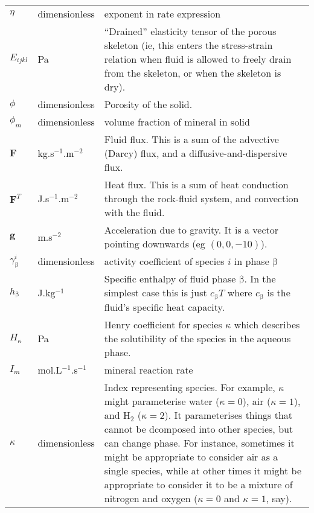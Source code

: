 \documentclass[12pt]{report}
\def\species{\kappa}
\def\phase{\mathrm{\beta}}
\def\flux{\mathbf{F}}
\begin{document}
\begin{longtable}{llp{10cm}}
$\eta$ & dimensionless & exponent in rate expression \\

$E_{ijkl}$ & Pa & ``Drained'' elasticity tensor of the porous skeleton
(ie, this enters the stress-strain relation when fluid is allowed to
freely drain from the skeleton, or when the skeleton is dry). \\

$\phi$ & dimensionless & Porosity of the solid. \\

$\phi_{m}$ & dimensionless & volume fraction of mineral in solid \\

$\flux$ & kg.s$^{-1}$.m$^{-2}$ & Fluid flux.  This is a sum of
the advective (Darcy) flux, and a diffusive-and-dispersive flux. \\

$\flux^{T}$ & J.s$^{-1}$.m$^{-2}$ & Heat flux.  This is a sum of heat
conduction through the rock-fluid system, and convection with the
fluid. \\

${\mathbf g}$ & m.s$^{-2}$ & Acceleration due to gravity.  It is a
vector pointing downwards (eg $(0, 0, -10)$). \\

$\gamma_{\phase}^{i}$ & dimensionless & activity coefficient of
species $i$ in phase $\phase$ \\

$h_{\phase}$ & J.kg$^{-1}$ & Specific enthalpy of fluid phase
$\phase$. In the simplest case this is just $c_{\phase}T$ where
$c_{\phase}$ is the fluid's specific heat capacity.\\

$H_{\species}$ & Pa & Henry coefficient for species $\species$ which
describes the solutibility of the species in the aqueous phase. \\

$I_{m}$ & mol.L$^{-1}$.s$^{-1}$ & mineral reaction rate \\

$\species$ & dimensionless & Index representing species.  For example, $\species$
might parameterise water ($\species=0$), air ($\species=1$), and H$_{2}$ ($\species=2$).  It
parameterises things that cannot be dcomposed into other species, but
can change phase.  For instance, sometimes it might be appropriate to
consider air as a single species, while at other times it might be
appropriate to consider it to be a mixture of nitrogen and oxygen
($\species=0$ and $\species=1$, say). \\


\end{longtable}
\end{document}
